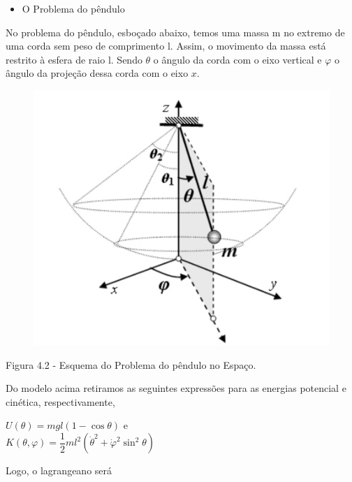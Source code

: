 \documentclass[12pt, a4paper]{article}
\begin{document}
\begin{itemize}
\item O Problema do pêndulo
\end{itemize}

No problema do pêndulo, esboçado abaixo, temos uma massa m no extremo de uma corda sem peso de comprimento l. Assim, o movimento da massa está restrito à esfera de raio l. Sendo $\theta$ o ângulo da corda com o eixo vertical e $\varphi$ o ângulo da projeção dessa corda com o eixo $x$.

\begin{figure}[!h]
    \centering
    \includegraphics[scale=0.6]{imgs/pendulo.PNG}

  \end{figure}
  
\begin{center}
  Figura 4.2 - Esquema do Problema do pêndulo no Espaço.
  \end{center}  
  
Do modelo acima retiramos as seguintes expressões para as energias potencial e cinética, respectivamente,

\begin{center}
$U(\theta) = mgl(1-\cos\theta)$ e\\
$K(\theta, \varphi) = \dfrac{1}{2}ml^2({\dot \theta}^2 + {\dot \varphi}^2 \sin^2 \theta)$
\end{center}
  
Logo, o lagrangeano será
\end{document}
